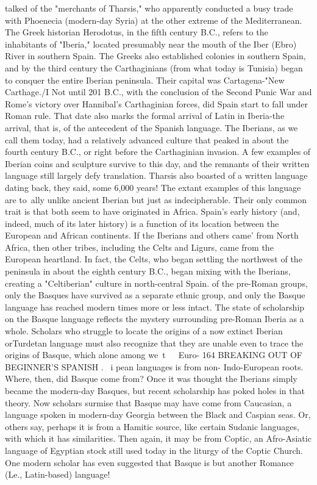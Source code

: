 talked of the "merchants of Tharsis," who apparently conducted a
busy trade with Phoenecia (modern-day Syria) at the other extreme of
the Mediterranean.
The Greek historian Herodotus, in the fifth century B.C., refers
to the inhabitants of "Iberia," located presumably near the mouth of
the Iber (Ebro) River in southern Spain. The Greeks also established
colonies in southern Spain, and by the third century the Carthaginians (from what today is Tunisia) began to conquer the entire Iberian
peninsula. Their capital was Cartagena-"New Carthage./I Not until
201 B.C., with the conclusion of the Second Punic War and Rome's victory over Hannibal's Carthaginian forces, did Spain start to fall under
Roman rule. That date also marks the formal arrival of Latin in Iberia-the arrival, that is, of the antecedent of the Spanish language.
The Iberians, as we call them today, had a relatively advanced
culture that peaked in about the fourth century B.C., or right before
the Carthaginian invasion. A few examples of Iberian coins and sculpture survive to this day, and the remnants of their written language
still largely defy translation. Tharsis also boasted of a written language dating back, they said, some 6,000 years! The extant examples
of this language are to~ally unlike ancient Iberian but just as indecipherable. Their only common trait is that both seem to have originated in Africa.
Spain's early history (and, indeed, much of its later history) is a
function of its location between the European and African continents.
If the Iberians and others came' from North Africa, then other tribes,
including the Celts and Ligurs, came from the European heartland. In
fact, the Celts, who began settling the northwest of the peninsula in
about the eighth century B.C., began mixing with the Iberians, creating
a "Celtiberian" culture in north-central Spain.
of the pre-Roman groups, only the Basques have survived
as a separate ethnic group, and only the Basque language has reached
modern times more or less intact. The state of scholarship on the
Basque language reflects the mystery surrounding pre-Roman Iberia
as a whole. Scholars who struggle to locate the origins of a now extinct
Iberian orTurdetan language must also recognize that they are unable
even to trace the origins of Basque, which alone among we~t~~~Euro-
164 BREAKING OUT OF BEGINNER'S SPANISH
.~
i
pean languages is from non- Indo-European roots. Where, then, did
Basque come from? Once it was thought the Iberians simply became
the modern-day Basques, but recent scholarship has poked holes in
that theory. Now scholars surmise that Basque may have come from
Caucasian, a language spoken in modern-day Georgia between the
Black and Caspian seas. Or, others say, perhaps it is from a Hamitic
source, like certain Sudanic languages, with which it has similarities.
Then again, it may be from Coptic, an Afro-Asiatic language of Egyptian stock still used today in the liturgy of the Coptic Church. One
modern scholar has even suggested that Basque is but another Romance (Le., Latin-based) language!

